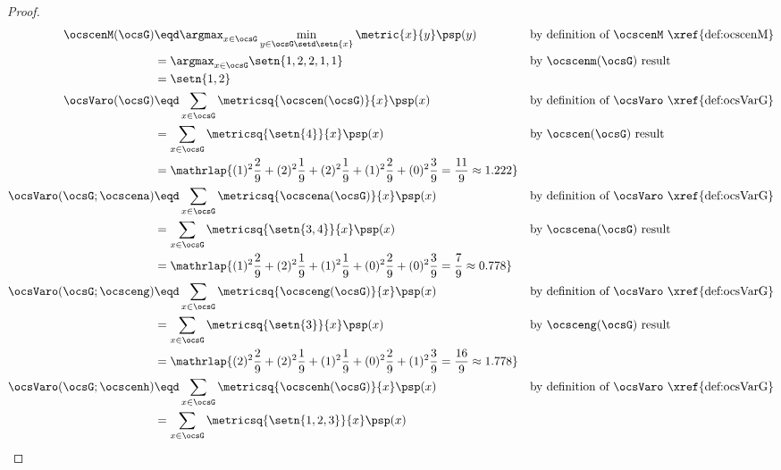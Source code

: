 \begin{tabstr}{0.75}
\begin{proof}
\begin{align*}
      \ocscenM(\ocsG)
        &\eqd \argmax_{x\in\ocsG}\min_{y\in\ocsG\setd\setn{x}}\metric{x}{y}\psp(y)
        &&\text{by definition of $\ocscenM$ \xref{def:ocscenM}}
      \\&= \argmax_{x\in\ocsG}\setn{1,2,2,1,1}
        && \text{by $\ocscenm(\ocsG)$ result}
      \\&= \setn{1,2}
      \\
      \ocsVaro(\ocsG)
        &\eqd \sum_{x\in\ocsG}\metricsq{\ocscen(\ocsG)}{x}\psp(x)
        && \text{by definition of $\ocsVaro$ \xref{def:ocsVarG}}
      \\&= \sum_{x\in\ocsG}\metricsq{\setn{4}}{x}\psp(x)
        && \text{by $\ocscen(\ocsG)$ result}
      \\&= \mathrlap{
           (1)^2\frac{2}{9}+  %
           (2)^2\frac{1}{9}+  %
           (2)^2\frac{1}{9}+  %
           (1)^2\frac{2}{9}+  %
           (0)^2\frac{3}{9}   %
         = \frac{11}{9}  \approx 1.222}
      \\
      \ocsVaro(\ocsG;\ocscena)
        &\eqd \sum_{x\in\ocsG}\metricsq{\ocscena(\ocsG)}{x}\psp(x)
        && \text{by definition of $\ocsVaro$ \xref{def:ocsVarG}}
      \\&= \sum_{x\in\ocsG}\metricsq{\setn{3,4}}{x}\psp(x)
        && \text{by $\ocscena(\ocsG)$ result}
      \\&= \mathrlap{
           (1)^2\frac{2}{9}+  %
           (2)^2\frac{1}{9}+  %
           (1)^2\frac{1}{9}+  %
           (0)^2\frac{2}{9}+  %
           (0)^2\frac{3}{9}   %
         = \frac{7}{9}  \approx 0.778}
      \\
      \ocsVaro(\ocsG;\ocsceng)
        &\eqd \sum_{x\in\ocsG}\metricsq{\ocsceng(\ocsG)}{x}\psp(x)
        && \text{by definition of $\ocsVaro$ \xref{def:ocsVarG}}
      \\&= \sum_{x\in\ocsG}\metricsq{\setn{3}}{x}\psp(x)
        && \text{by $\ocsceng(\ocsG)$ result}
      \\&= \mathrlap{
           (2)^2\frac{2}{9}+  %
           (2)^2\frac{1}{9}+  %
           (1)^2\frac{1}{9}+  %
           (0)^2\frac{2}{9}+  %
           (1)^2\frac{3}{9}   %
         = \frac{16}{9}  \approx 1.778}
      \\
      \ocsVaro(\ocsG;\ocscenh)
        &\eqd \sum_{x\in\ocsG}\metricsq{\ocscenh(\ocsG)}{x}\psp(x)
        && \text{by definition of $\ocsVaro$ \xref{def:ocsVarG}}
      \\&= \sum_{x\in\ocsG}\metricsq{\setn{1,2,3}}{x}\psp(x)

\end{align*}
\end{proof}
\end{tabstr}
